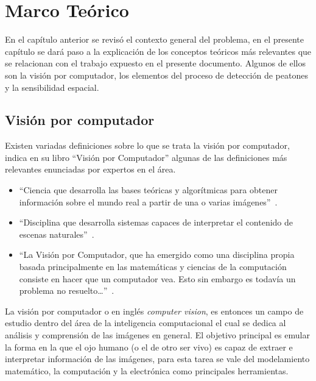 
\chapter{Marco Te\'orico}
\label{cap:preliminares}

En el capítulo anterior se revisó el contexto general del problema, en el presente capítulo se dará paso a la explicación de los conceptos teóricos más relevantes que se relacionan con el trabajo expuesto en el presente documento. Algunos de ellos son la visión por computador, los elementos del proceso de detección de peatones y la sensibilidad espacial.

\section{Visión por computador}
\label{preliminares:cv}

Existen variadas definiciones sobre lo que se trata la visión por computador, \cite{mery2004} indica en su libro ``Visión por Computador'' algunas de las definiciones más relevantes enunciadas por expertos en el área.

\begin{itemize}
\item ``Ciencia que desarrolla las bases teóricas y algorítmicas para obtener información sobre el mundo real a partir de una o varias imágenes''~\citep{haralick1992}.
\item ``Disciplina que desarrolla sistemas capaces de interpretar el contenido de escenas naturales''~\citep{kennethr.1996}.
\item ``La Visión por Computador, que ha emergido como una disciplina propia basada principalmente en las matemáticas y ciencias de la computación consiste en hacer que un computador vea. Esto sin embargo es todavía un problema no resuelto\ldots''~\citep{hartley2003}.
\end{itemize}

La visión por computador o en inglés \textit{computer vision}, es entonces un campo de estudio dentro del área de la inteligencia computacional el cual se dedica al análisis y comprensión de las imágenes en general. El objetivo principal es emular la forma en la que el ojo humano (o el de otro ser vivo) es capaz de extraer e interpretar información de las imágenes, para esta tarea se vale del modelamiento matemático, la computación y la electrónica como principales herramientas. 

